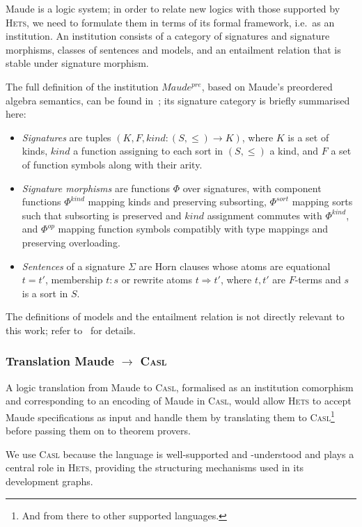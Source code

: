 \documentclass[11pt]{article}
\newcommand{\Casl}{\textsc{Casl}}
\newcommand{\Hets}{\textsc{Hets}}
\begin{document}
Maude is a logic system; in order to relate new logics with those supported by \Hets{}, we need to formulate them in terms of its formal framework, i.e.\ as an institution. An institution consists of a category of signatures and signature morphisms, classes of sentences and models, and an entailment relation that is stable under signature morphism.

The full definition of the institution $Maude^{pre}$, based on Maude's preordered algebra semantics, can be found in~\cite{Codescu:2010}; its signature category is briefly summarised here:

\begin{itemize}
  \item \emph{Signatures} are tuples $(K, F, kind : (S, \leq) \rightarrow K)$, where $K$ is a set of kinds, $kind$ a function assigning to each sort in $(S, \leq)$ a kind, and $F$ a set of function symbols along with their arity.
  \item \emph{Signature morphisms} are functions $\Phi$ over signatures, with component functions $\Phi^{kind}$ mapping kinds and preserving subsorting, $\Phi^{sort}$ mapping sorts such that subsorting is preserved and $kind$ assignment commutes with $\Phi^{kind}$, and $\Phi^{op}$ mapping function symbols compatibly with type mappings and preserving overloading.
  \item \emph{Sentences} of a signature $\Sigma$ are Horn clauses whose atoms are equational $t = t'$, membership $t : s$ or rewrite atoms $t \Rightarrow t'$, where $t, t'$ are $F$-terms and $s$ is a sort in $S$.
\end{itemize}

The definitions of models and the entailment relation is not directly relevant to this work; refer to~\cite{Codescu:2010} for details.


\subsubsection{Translation Maude $\rightarrow$ \Casl{}}
\label{sec:2_1_2}

A logic translation from Maude to \Casl{}, formalised as an institution comorphism and corresponding to an encoding of Maude in \Casl{}, would allow \Hets{} to accept Maude specifications as input and handle them by translating them to \Casl{}\footnote{And from there to other supported languages.} before passing them on to theorem provers.

We use \Casl{} because the language is well-supported and -understood and plays a central role in \Hets{}, providing the structuring mechanisms used in its development graphs.
\end{document}
